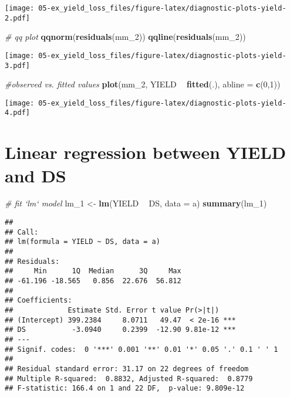 \documentclass[]{book}
\newenvironment{Shaded}{\begin{snugshade}}{\end{snugshade}}
\newcommand{\CommentTok}[1]{\textcolor[rgb]{0.56,0.35,0.01}{\textit{#1}}}
\newcommand{\DataTypeTok}[1]{\textcolor[rgb]{0.13,0.29,0.53}{#1}}
\newcommand{\DecValTok}[1]{\textcolor[rgb]{0.00,0.00,0.81}{#1}}
\newcommand{\KeywordTok}[1]{\textcolor[rgb]{0.13,0.29,0.53}{\textbf{#1}}}
\newcommand{\NormalTok}[1]{#1}
\newcommand{\OperatorTok}[1]{\textcolor[rgb]{0.81,0.36,0.00}{\textbf{#1}}}
\newcommand{\StringTok}[1]{\textcolor[rgb]{0.31,0.60,0.02}{#1}}
\begin{document}
\texttt{[image: 05-ex\_yield\_loss\_files/figure-latex/diagnostic-plots-yield-2.pdf]}

\begin{Shaded}
\begin{Highlighting}[]
\CommentTok{# qq plot}
\KeywordTok{qqnorm}\NormalTok{(}\KeywordTok{residuals}\NormalTok{(mm_}\DecValTok{2}\NormalTok{))}
\KeywordTok{qqline}\NormalTok{(}\KeywordTok{residuals}\NormalTok{(mm_}\DecValTok{2}\NormalTok{))}
\end{Highlighting}
\end{Shaded}

\texttt{[image: 05-ex\_yield\_loss\_files/figure-latex/diagnostic-plots-yield-3.pdf]}

\begin{Shaded}
\begin{Highlighting}[]
\CommentTok{#observed vs. fitted values}
\KeywordTok{plot}\NormalTok{(mm_}\DecValTok{2}\NormalTok{, YIELD }\OperatorTok{~}\StringTok{ }\KeywordTok{fitted}\NormalTok{(.), }\DataTypeTok{abline =} \KeywordTok{c}\NormalTok{(}\DecValTok{0}\NormalTok{,}\DecValTok{1}\NormalTok{))}
\end{Highlighting}
\end{Shaded}

\texttt{[image: 05-ex\_yield\_loss\_files/figure-latex/diagnostic-plots-yield-4.pdf]}

\hypertarget{linear-regression-between-yield-and-ds}{%
\section{Linear regression between YIELD and DS}\label{linear-regression-between-yield-and-ds}}

\begin{Shaded}
\begin{Highlighting}[]
\CommentTok{# fit `lm` model}
\NormalTok{lm_}\DecValTok{1}\NormalTok{ <-}\StringTok{ }\KeywordTok{lm}\NormalTok{(YIELD }\OperatorTok{~}\StringTok{ }\NormalTok{DS, }\DataTypeTok{data =}\NormalTok{ a) }
\KeywordTok{summary}\NormalTok{(lm_}\DecValTok{1}\NormalTok{)}
\end{Highlighting}
\end{Shaded}

\begin{verbatim}
## 
## Call:
## lm(formula = YIELD ~ DS, data = a)
## 
## Residuals:
##     Min      1Q  Median      3Q     Max 
## -61.196 -18.565   0.856  22.676  56.812 
## 
## Coefficients:
##             Estimate Std. Error t value Pr(>|t|)    
## (Intercept) 399.2384     8.0711   49.47  < 2e-16 ***
## DS           -3.0940     0.2399  -12.90 9.81e-12 ***
## ---
## Signif. codes:  0 '***' 0.001 '**' 0.01 '*' 0.05 '.' 0.1 ' ' 1
## 
## Residual standard error: 31.17 on 22 degrees of freedom
## Multiple R-squared:  0.8832, Adjusted R-squared:  0.8779 
## F-statistic: 166.4 on 1 and 22 DF,  p-value: 9.809e-12
\end{verbatim}
\end{document}
